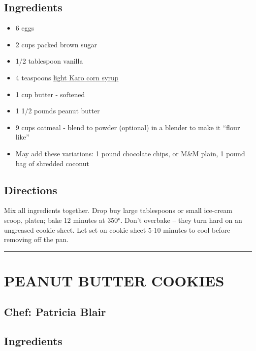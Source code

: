 \documentclass[
]{book}
\providecommand{\tightlist}{%
  \setlength{\itemsep}{0pt}\setlength{\parskip}{0pt}}
\begin{document}
\hypertarget{ingredients-99}{%
\subsection*{Ingredients}\label{ingredients-99}}


\begin{itemize}
\tightlist
\item
  6 eggs
\item
  2 cups packed brown sugar
\item
  1/2 tablespoon vanilla
\item
  4 teaspoons \href{https://en.wikipedia.org/wiki/Corn_syrup}{light Karo corn syrup}
\item
  1 cup butter - softened
\item
  1 1/2 pounds peanut butter
\item
  9 cups oatmeal - blend to powder (optional) in a blender to make it ``flour like''
\item
  May add these variations: 1 pound chocolate chips, or M\&M plain, 1 pound bag of shredded coconut
\end{itemize}

\hypertarget{directions-99}{%
\subsection*{Directions}\label{directions-99}}


Mix all ingredients together. Drop buy large tablespoons or small ice-cream scoop, platen; bake 12 minutes at 350°. Don't overbake -- they turn hard on an ungreased cookie sheet. Let set on cookie sheet 5-10 minutes to cool before removing off the pan.

\begin{center}\rule{0.5\linewidth}{0.5pt}\end{center}

\hypertarget{peanut-butter-cookies}{%
\section*{PEANUT BUTTER COOKIES}\label{peanut-butter-cookies}}


\hypertarget{chef-patricia-blair-17}{%
\subsection*{Chef: Patricia Blair}\label{chef-patricia-blair-17}}


\hypertarget{ingredients-100}{%
\subsection*{Ingredients}\label{ingredients-100}}
\end{document}
